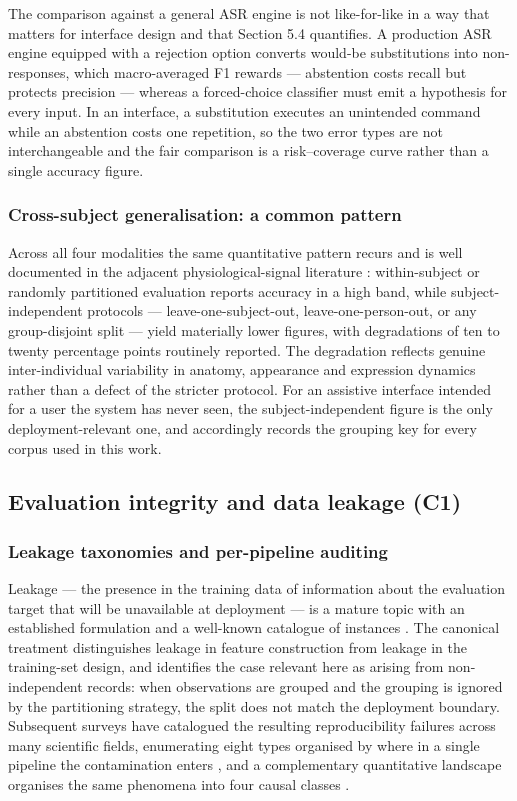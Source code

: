 The comparison against a general ASR engine  is not like-for-like in a way that matters for interface design and that Section 5.4 quantifies. A production ASR engine equipped with a rejection option converts would-be substitutions into non-responses, which macro-averaged F1 rewards --- abstention costs recall but protects precision --- whereas a forced-choice classifier must emit a hypothesis for every input. In an interface, a substitution executes an unintended command while an abstention costs one repetition, so the two error types are not interchangeable and the fair comparison is a risk--coverage curve rather than a single accuracy figure.

\subsubsection{Cross-subject generalisation: a common pattern}

Across all four modalities the same quantitative pattern recurs and is well documented in the adjacent physiological-signal literature : within-subject or randomly partitioned evaluation reports accuracy in a high band, while subject-independent protocols --- leave-one-subject-out, leave-one-person-out, or any group-disjoint split --- yield materially lower figures, with degradations of ten to twenty percentage points routinely reported. The degradation reflects genuine inter-individual variability in anatomy, appearance and expression dynamics rather than a defect of the stricter protocol. For an assistive interface intended for a user the system has never seen, the subject-independent figure is the only deployment-relevant one, and  accordingly records the grouping key for every corpus used in this work.

\FloatBarrier

\subsection{Evaluation integrity and data leakage (C1)}

\subsubsection{Leakage taxonomies and per-pipeline auditing}

Leakage --- the presence in the training data of information about the evaluation target that will be unavailable at deployment --- is a mature topic with an established formulation and a well-known catalogue of instances . The canonical treatment  distinguishes leakage in feature construction from leakage in the training-set design, and identifies the case relevant here as arising from non-independent records: when observations are grouped and the grouping is ignored by the partitioning strategy, the split does not match the deployment boundary. Subsequent surveys have catalogued the resulting reproducibility failures across many scientific fields, enumerating eight types organised by where in a single pipeline the contamination enters , and a complementary quantitative landscape organises the same phenomena into four causal classes .

